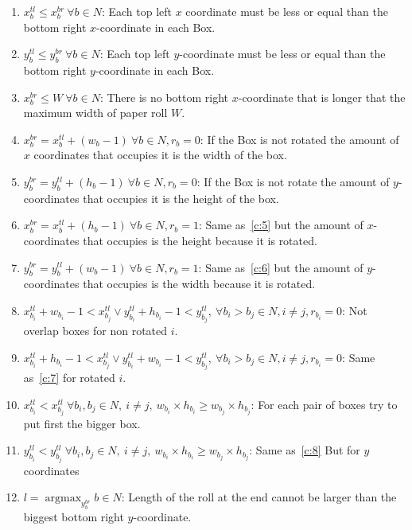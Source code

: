 \documentclass[12pt, a4paper]{article}
\DeclareMathOperator*{\argmax}{argmax} %
\begin{document}
\begin{enumerate}
  \item $x_b^{tl} \leq x_b^{br}\ \forall b \in N$: Each top left $x$ coordinate must be less or equal than the bottom right $x$-coordinate in each Box.
  \item $y_b^{tl} \leq y_b^{br}\ \forall b \in N$: Each top left $y$-coordinate must be less or equal than the bottom right $y$-coordinate in each Box.
  \item\label{c:4} $x_b^{br} \leq W\ \forall b \in N$: There is no bottom right $x$-coordinate that is longer that the maximum width of paper roll $W$.
\item\label{c:5} $x_b^{br} = x_b^{tl} + (w_b - 1)\ \forall b \in N, r_b = 0$: If the Box is not rotated the amount of $x$ coordinates that occupies it is the width of the box.
\item\label{c:6} $y_b^{br} = y_b^{tl} + (h_b - 1)\ \forall b \in N, r_b = 0$: If the Box is not rotate the amount of $y$-coordinates that occupies it is the height of the box.
\item $x_b^{br} = x_b^{tl} + (h_b - 1)\ \forall b \in N, r_b = 1$: Same as~\ref{c:5} but the amount of $x$-coordinates that occupies is the height because it is rotated.
  \item $y_b^{br} = y_b^{tl} + (w_b - 1)\ \forall b \in N, r_b = 1$: Same as~\ref{c:6} but the amount of $y$-coordinates that occupies is the width because it is rotated.
  \item\label{c:7} $x_{b_i}^{tl} + w_{b_i} - 1 < x_{b_j}^{tl} \lor y_{b_i}^{tl} + h_{b_i} - 1 < y_{b_j}^{tl}, \ \forall b_i > b_j \in N, i \neq j, r_{b_i} = 0$: Not overlap boxes for non rotated $i$.
  \item $x_{b_i}^{tl} + h_{b_i} - 1 < x_{b_j}^{tl} \lor y_{b_i}^{tl} + w_{b_i} - 1 < y_{b_j}^{tl}, \ \forall b_i > b_j \in N, i \neq j, r_{b_i} = 0$: Same as~\ref{c:7} for rotated $i$.
  \item\label{c:8} $x_{b_i}^{tl} < x_{b_j}^{tl}\ \forall b_i, b_j \in N,\ i \neq j,\ w_{b_i} \times h_{b_i} \geq w_{b_j} \times h_{b_j}$: For each pair of boxes try to put first the bigger box.
  \item $y_{b_i}^{tl} < y_{b_j}^{tl}\ \forall b_i, b_j \in N,\ i \neq j,\ w_{b_i} \times h_{b_i} \geq w_{b_j} \times h_{b_j}$: Same as~\ref{c:8} But for $y$ coordinates
  \item $l = \argmax_{y_b^{br}} {b \in N}$: Length of the roll at the end cannot be larger than the biggest bottom right $y$-coordinate.
\end{enumerate}
\end{document}
